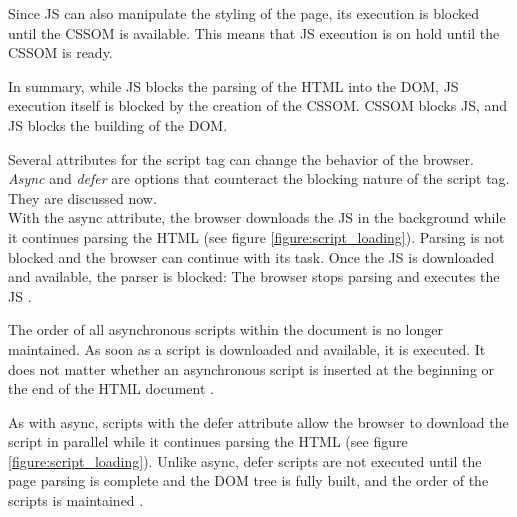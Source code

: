 


Since JS can also manipulate the styling of the page, its execution is blocked until the CSSOM is available.
This means that JS execution is on hold until the CSSOM is ready.

In summary, while JS blocks the parsing of the HTML into the DOM, JS execution itself is blocked by the creation of the CSSOM.
CSSOM blocks JS, and JS blocks the building of the DOM\cite{2013Grigorik}. %

Several attributes for the script tag can change the behavior of the browser.
\textit{Async} and \textit{defer} are options that counteract the blocking nature of the script tag.
They are discussed now. \\




With the async attribute, the browser downloads the JS in the background while it continues parsing the HTML (see figure \ref{figure:script_loading}).
Parsing is not blocked and the browser can continue with its task. 
Once the JS is downloaded and available, the parser is blocked: The browser stops parsing and executes the JS \cite{2021MDNScript}.

The order of all asynchronous scripts within the document is no longer maintained.
As soon as a script is downloaded and available, it is executed.
It does not matter whether an asynchronous script is inserted at the beginning or the end of the HTML document \cite{2020Monus}.




As with async, scripts with the defer attribute allow the browser to download the script in parallel while it continues parsing the HTML (see figure \ref{figure:script_loading}).
Unlike async, defer scripts are not executed until the page parsing is complete and the DOM tree is fully built, and the order of the scripts is maintained \cite{2020Monus}.

